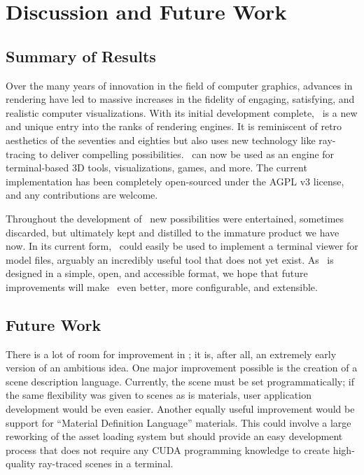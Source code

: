%
%
%

\chapter{Discussion and Future Work}\label{ch:conclusion}

\section{Summary of Results}\label{ch:conclusion:summary}

Over the many years of innovation in the field of computer graphics, advances in rendering have led to massive increases in the fidelity of engaging, satisfying, and realistic computer visualizations.
With its initial development complete, \name\ is a new and unique entry into the ranks of rendering engines.
It is reminiscent of retro aesthetics of the seventies and eighties but also uses new technology like ray-tracing to deliver compelling possibilities.
\name\ can now be used as an engine for terminal-based 3D tools, visualizations, games, and more.
The current implementation has been completely open-sourced under the AGPL v3 license, and any contributions are welcome.

Throughout the development of \name\ new possibilities were entertained, sometimes discarded, but ultimately kept and distilled to the immature product we have now.
In its current form, \name\ could easily be used to implement a terminal viewer for model files, arguably an incredibly useful tool that does not yet exist.
As \name\ is designed in a simple, open, and accessible format, we hope that future improvements will make \name\ even better, more configurable, and extensible.

\section{Future Work}\label{ch:conclusion:future}

There is a lot of room for improvement in \name; it is, after all, an extremely early version of an ambitious idea.
One major improvement possible is the creation of a scene description language.
Currently, the scene must be set programmatically; if the same flexibility was given to scenes as is materials, user application development would be even easier.
Another equally useful improvement would be support for ``Material Definition Language'' \cite{nvidia2015mdl} materials.
This could involve a large reworking of the asset loading system but should provide an easy development process that does not require any CUDA programming knowledge to create high-quality ray-traced scenes in a terminal.

